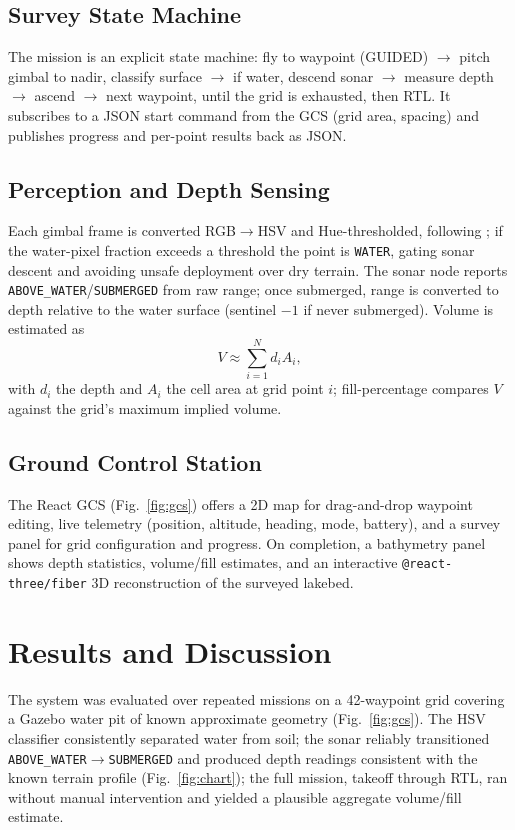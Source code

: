 \documentclass[9pt,twocolumn]{article}
\begin{document}
\subsection{Survey State Machine}
The mission is an explicit state machine: fly to waypoint (GUIDED) $\rightarrow$ pitch gimbal to nadir, classify surface $\rightarrow$ if water, descend sonar $\rightarrow$ measure depth $\rightarrow$ ascend $\rightarrow$ next waypoint, until the grid is exhausted, then RTL. It subscribes to a JSON start command from the GCS (grid area, spacing) and publishes progress and per-point results back as JSON.

\subsection{Perception and Depth Sensing}
Each gimbal frame is converted RGB$\to$HSV and Hue-thresholded, following \cite{namikawa2016hsvwater}; if the water-pixel fraction exceeds a threshold the point is \texttt{WATER}, gating sonar descent and avoiding unsafe deployment over dry terrain. The sonar node reports \texttt{ABOVE\_WATER}/\texttt{SUBMERGED} from raw range; once submerged, range is converted to depth relative to the water surface (sentinel $-1$ if never submerged). Volume is estimated as
\begin{equation}
V \approx \sum_{i=1}^{N} d_i A_i,
\end{equation}
with $d_i$ the depth and $A_i$ the cell area at grid point $i$; fill-percentage compares $V$ against the grid's maximum implied volume.

\subsection{Ground Control Station}
The React GCS (Fig.~\ref{fig:gcs}) offers a 2D map for drag-and-drop waypoint editing, live telemetry (position, altitude, heading, mode, battery), and a survey panel for grid configuration and progress. On completion, a bathymetry panel shows depth statistics, volume/fill estimates, and an interactive \texttt{@react-three/fiber} 3D reconstruction of the surveyed lakebed.

\section{Results and Discussion}
The system was evaluated over repeated missions on a 42-waypoint grid covering a Gazebo water pit of known approximate geometry (Fig.~\ref{fig:gcs}). The HSV classifier consistently separated water from soil; the sonar reliably transitioned \texttt{ABOVE\_WATER}$\to$\texttt{SUBMERGED} and produced depth readings consistent with the known terrain profile (Fig.~\ref{fig:chart}); the full mission, takeoff through RTL, ran without manual intervention and yielded a plausible aggregate volume/fill estimate.
\end{document}
